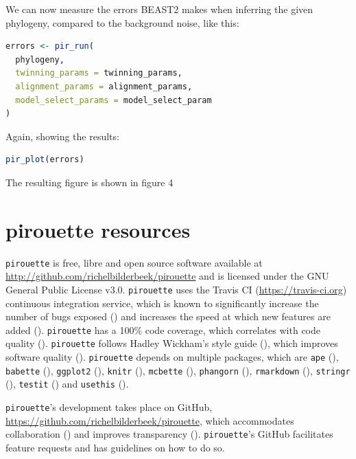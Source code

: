 \documentclass{article}
\begin{document}
We can now measure the errors BEAST2
makes when inferring the given phylogeny, compared
to the background noise, like this:

\begin{lstlisting}[language=R, floatplacement=H]
errors <- pir_run(
  phylogeny,
  twinning_params = twinning_params,
  alignment_params = alignment_params,
  model_select_params = model_select_param
)
\end{lstlisting}

Again, showing the results:

\begin{lstlisting}[language=R, floatplacement=H]
pir_plot(errors)
\end{lstlisting}

The resulting figure is shown in figure 4
\section{pirouette resources}

\verb;pirouette; is free, libre and open source software available at 
\url{http://github.com/richelbilderbeek/pirouette}
and is licensed under the GNU General Public License v3.0.
\verb;pirouette; uses the Travis CI (\url{https://travis-ci.org})
continuous integration service, which is known to significantly 
increase the number of bugs exposed (\cite{vasilescu2015}) and increases
the speed at which new features are added (\cite{vasilescu2015}).
\verb;pirouette; has a 100\% code coverage, which correlates with 
code quality (\cite{horgan1994,del1995correlation}). 
\verb;pirouette; follows Hadley Wickham's style guide (\cite{style_guide}), 
which improves software quality (\cite{fang2001}).
\verb;pirouette; depends on multiple packages, which are 
\verb;ape; (\cite{APE}), 
\verb;babette; (\cite{bilderbeek2018babette}),
\verb;ggplot2; (\cite{ggplot2}),
\verb;knitr; (\cite{knitr}),
\verb;mcbette; (\cite{mcbette}),
\verb;phangorn; (\cite{phangorn}),
\verb;rmarkdown; (\cite{rmarkdown}),
\verb;stringr; (\cite{stringr}),
\verb;testit; (\cite{testit}) and 
\verb;usethis; (\cite{usethis}).

\verb;pirouette;'s development takes place on GitHub,
\url{https://github.com/richelbilderbeek/pirouette}, 
which accommodates collaboration (\cite{perez2016ten}) 
and improves transparency (\cite{gorgolewski2016practical}).
\verb;pirouette;'s GitHub facilitates feature requests and 
has guidelines on how to do so.
\end{document}
